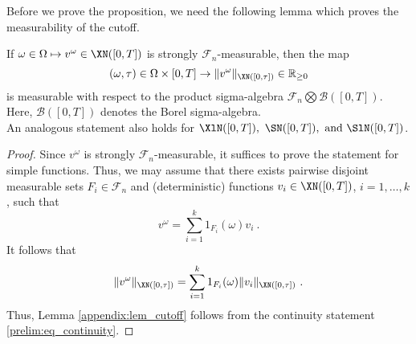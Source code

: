 \documentclass[11pt]{article}
\begin{document}
Before we prove the proposition, we need the following lemma which proves the measurability of the cutoff. 

\begin{lem}\label{appendix:lem_cutoff}
If \( \omega \in \Omega \mapsto v^\omega \in \XN([0,T]) \) is strongly \( \mathscr{F}_n \)-measurable, then the map 
\begin{equation*}
(\omega,\tau) \in \Omega \times [0,T] \rightarrow \| v^\omega \|_{\XN([0,\tau])} \in \mathbb{R}_{\geq 0} 
\end{equation*}
is measurable with respect to the product sigma-algebra \( \mathscr{F}_n \bigotimes \mathscr{B}([0,T]) \). Here, \( \mathscr{B}([0,T]) \) denotes the Borel sigma-algebra. \\
An analogous statement also holds for \( \XlN([0,T]), ~ \SN([0,T]), ~ \text{and} ~ \SlN([0,T]) \). 
\end{lem}
\begin{proof}
Since \( v^\omega \) is strongly \( \mathscr{F}_n \)-measurable, it suffices to prove the statement for simple functions. Thus, we may assume that there exists pairwise disjoint measurable sets \( F_i \in \mathscr{F}_n \) and (deterministic) functions \( v_i \in \XN([0,T]) \), \( i=1,\hdots, k \), such that 
\begin{equation*}
v^\omega  = \sum_{i=1}^k 1_{F_i}(\omega) v_i ~. 
\end{equation*} 
It follows that \begin{equation*}
\| v^\omega \|_{\XN([0,\tau])} = \sum_{i=1}^k 1_{F_i}(\omega) \| v_i \|_{\XN([0,\tau])}~. 
\end{equation*}
Thus, Lemma \ref{appendix:lem_cutoff}  follows from the continuity statement \eqref{prelim:eq_continuity}.
\end{proof}
\end{document}
